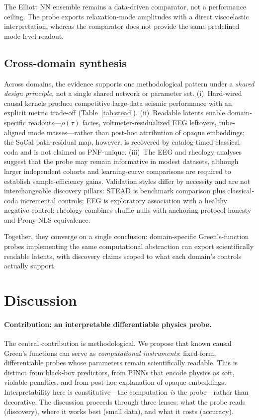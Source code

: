 \documentclass[twocolumn, 10pt]{article}
\begin{document}
The Elliott NN ensemble remains a data-driven comparator, not a performance ceiling. The probe exports relaxation-mode amplitudes with a direct viscoelastic interpretation, whereas the comparator does not provide the same predefined mode-level readout\cite{llm4sd2025,berner2026}.

\subsection*{Cross-domain synthesis}

Across domains, the evidence supports one methodological pattern under a \emph{shared design principle}, not a single shared network or parameter set. (i)~Hard-wired causal kernels produce competitive large-data seismic performance with an explicit metric trade-off (Table~\ref{tab:stead}). (ii)~Readable latents enable domain-specific readouts---\(\rho(\tau)\) facies, voltmeter-residualized EEG leftovers, tube-aligned mode masses---rather than post-hoc attribution of opaque embeddings; the SoCal path-residual map, however, is recovered by catalog-timed classical coda and is not claimed as PNF-unique. (iii)~The EEG and rheology analyses suggest that the probe may remain informative in modest datasets, although larger independent cohorts and learning-curve comparisons are required to establish sample-efficiency gains. Validation styles differ by necessity and are not interchangeable discovery pillars: STEAD is benchmark comparison plus classical-coda incremental controls; EEG is exploratory association with a healthy negative control; rheology combines shuffle nulls with anchoring-protocol honesty and Prony-NLS equivalence.

Together, they converge on a single conclusion: domain-specific Green's-function probes implementing the same computational abstraction can export scientifically readable latents, with discovery claims scoped to what each domain's controls actually support.


\section*{Discussion}

\paragraph{Contribution: an interpretable differentiable physics probe.}
The central contribution is methodological. We propose that known causal Green's functions can serve as \emph{computational instruments}: fixed-form, differentiable probes whose parameters remain scientifically readable. This is distinct from black-box predictors, from PINNs that encode physics as soft, violable penalties\cite{raissi2019pinn,karniadakis2021}, and from post-hoc explanation of opaque embeddings\cite{ilievski2025,llm4sd2025}. Interpretability here is constitutive---the computation \emph{is} the probe---rather than decorative. The discussion proceeds through three lenses: what the probe reads (discovery), where it works best (small data), and what it costs (accuracy).
\end{document}
